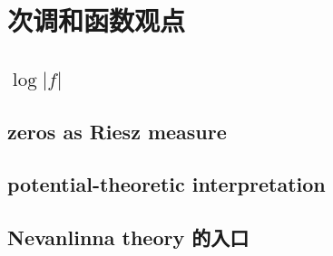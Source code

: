\section{次调和函数观点}
\label{b3:sec:1803}


\subsection{\texorpdfstring{\(\log |f|\)}{|f|}}
\label{b3:subsec:180301}

\subsection{zeros as Riesz measure}
\label{b3:subsec:180302}

\subsection{potential-theoretic interpretation}
\label{b3:subsec:180303}

\subsection{Nevanlinna theory 的入口}
\label{b3:subsec:180304}


